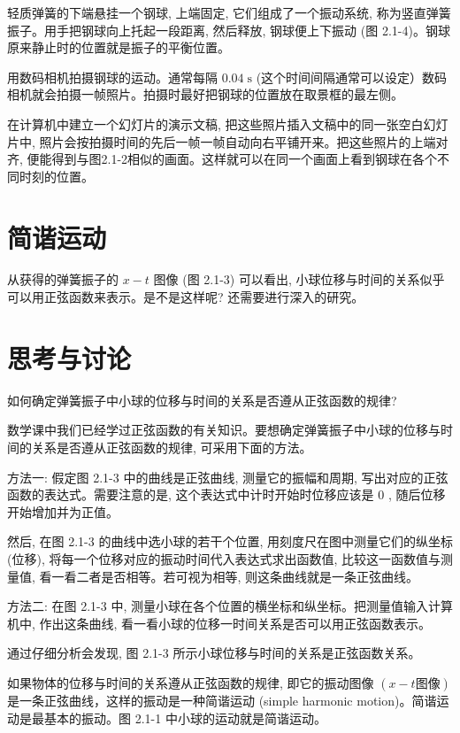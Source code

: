 \documentclass[10pt]{article}
\begin{document}
轻质弹簧的下端悬挂一个钢球, 上端固定, 它们组成了一个振动系统, 称为竖直弹簧振子。用手把钢球向上托起一段距离, 然后释放, 钢球便上下振动 (图 2.1-4)。钢球原来静止时的位置就是振子的平衡位置。

用数码相机拍摄钢球的运动。通常每隔 \({0.04}\mathrm{\;s}\) (这个时间间隔通常可以设定）数码相机就会拍摄一帧照片。拍摄时最好把钢球的位置放在取景框的最左侧。

在计算机中建立一个幻灯片的演示文稿, 把这些照片插入文稿中的同一张空白幻灯片中, 照片会按拍摄时间的先后一帧一帧自动向右平铺开来。把这些照片的上端对齐, 便能得到与图2.1-2相似的画面。这样就可以在同一个画面上看到钢球在各个不同时刻的位置。

\section*{简谐运动}

从获得的弹簧振子的 \(x - t\) 图像 (图 2.1-3) 可以看出, 小球位移与时间的关系似乎可以用正弦函数来表示。是不是这样呢? 还需要进行深入的研究。

\section*{思考与讨论}

如何确定弹簧振子中小球的位移与时间的关系是否遵从正弦函数的规律?

数学课中我们已经学过正弦函数的有关知识。要想确定弹簧振子中小球的位移与时间的关系是否遵从正弦函数的规律, 可采用下面的方法。

方法一: 假定图 2.1-3 中的曲线是正弦曲线, 测量它的振幅和周期, 写出对应的正弦函数的表达式。需要注意的是, 这个表达式中计时开始时位移应该是 0 , 随后位移开始增加并为正值。

然后, 在图 2.1-3 的曲线中选小球的若干个位置, 用刻度尺在图中测量它们的纵坐标 (位移), 将每一个位移对应的振动时间代入表达式求出函数值, 比较这一函数值与测量值, 看一看二者是否相等。若可视为相等, 则这条曲线就是一条正弦曲线。

方法二: 在图 2.1-3 中, 测量小球在各个位置的横坐标和纵坐标。把测量值输入计算机中, 作出这条曲线, 看一看小球的位移一时间关系是否可以用正弦函数表示。

通过仔细分析会发现, 图 2.1-3 所示小球位移与时间的关系是正弦函数关系。

如果物体的位移与时间的关系遵从正弦函数的规律, 即它的振动图像 \(\left( {x - t\text{图像}}\right)\) 是一条正弦曲线，这样的振动是一种简谐运动 (simple harmonic motion)。简谐运动是最基本的振动。图 2.1-1 中小球的运动就是简谐运动。
\end{document}
